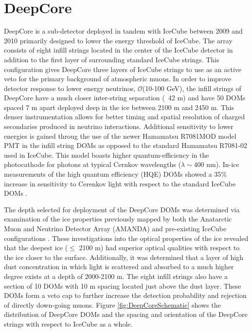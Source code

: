 \documentclass{gatech-thesis}
\begin{document}
\section{DeepCore}

DeepCore \cite{2012APh....35..615A} is a sub-detector deployed in tandem with IceCube between 2009 and 2010 primarily designed to lower the energy threshold of IceCube. The array consists of eight infill strings located in the center of the IceCube detector in addition to the first layer of surrounding standard IceCube strings. This configuration gives DeepCore three layers of IceCube strings to use as an active veto for the primary background of atmospheric muons. In order to improve detector response to lower energy neutrinos, $\mathcal{O}$(10-100 GeV), the infill strings of DeepCore have a much closer inter-string separation (~42 m) and have 50 DOMs spaced 7 m apart deployed deep in the ice between 2100 m and 2450 m. This denser instrumentation allows for better timing and spatial resolution of charged secondaries produced in neutrino interactions. Additional sensitivity to lower energies is gained throug the use of the newer Hamamatsu R7081MOD model PMT in the infill string DOMs as opposed to the standard Hamamatsu R7081-02 used in IceCube. This model boasts higher quantum-efficiency in the photocathode for photons at typical Cernkov wavelengths ($\lambda \sim 400$ nm). In-ice measurements of the high quantum efficiency (HQE) DOMs showed a 35$\%$ increase in sensitivity to Cerenkov light with respect to the standard IceCube DOMs \cite{2012APh....35..615A}.

The depth selected for deployment of the DeepCore DOMs was determined via examination of the ice properties previously mapped by both the Anatarctic Muon and Neutrino Detector Array (AMANDA) \cite{2006JGRD..11113203A} and pre-existing IceCube configurations \cite{2013JGlac..59.1117.}. These investigations into the optical properties of the ice revealed that the deepest ice ($\leq$ 2100 m) had superior optical qualities with respect to the ice closer to the surface. Additionally, it was determined that a layer of high dust concentration in which light is scattered and absorbed to a much higher degree exists at a depth of 2000-2100 m. The eight infill strings also have a section of 10 DOMs with 10 m spacing located just above the dust layer. These DOMs form a veto cap to further increase the detection probability and rejection of directly down-going muons. Figure \ref{fig:DeepCoreSchematic} shows the distribution of DeepCore DOMs and the spacing and orientation of the DeepCore strings with respect to IceCube as a whole.
\end{document}
